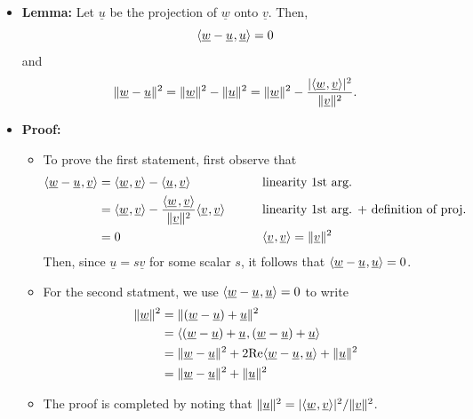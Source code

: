 \documentclass[11pt,twoside]{report}
\newcommand{\vecnot}{\underline}
\newcommand{\Real}{\mathrm{Re}}
\newcommand{\inner}[2]{{\left\langle #1 \mskip2mu , #2 \right\rangle}}
\newcommand{\tinner}[2]{{\langle #1 \mskip1mu , #2 \rangle}}
\begin{document}
\begin{itemize}
\begin{center}
\end{center}

\item \textbf{Lemma:} 
Let $\vecnot{u}$ be the projection of $\vecnot{w}$ onto $\vecnot{v}$.
Then, 
\[
\tinner{ \vecnot{w}-\vecnot{u} }{ \vecnot{u} } = 0
\]
and
\[ \|\vecnot{w}-\vecnot{u}\|^2 =  \|\vecnot{w}\|^2 - \| \vecnot{u} \|^2 = \|\vecnot{w}\|^2 - \frac{|\tinner{ \vecnot{w} }{ \vecnot{v} }|^2}{\|\vecnot{v}\|^2}. \]


\item \textbf{Proof:} 
\begin{itemize}
\item To prove the first statement, first observe that
\begin{alignat*}{3}
\tinner{ \vecnot{w} - \vecnot{u} }{ \vecnot{v} } & = \tinner{ \vecnot{w} }{ \vecnot{v} } - \tinner{ \vecnot{u} }{ \vecnot{v} }&\qquad & \text{linearity 1st arg.}\\
&  = \tinner{ \vecnot{w} }{ \vecnot{v} } - \frac{\inner{ \vecnot{w} }{ \vecnot{v} }}{\|\vecnot{v}\|^2} \tinner{ \vecnot{v} }{ \vecnot{v} }&& \text{linearity 1st arg. + definition of proj.}\\
&  = 0 && \tinner{ \vecnot{v} }{ \vecnot{v} } = \|\vecnot{v} \|^2
\end{alignat*}
Then, since $\vecnot{u} = s \vecnot{v}$ for some scalar $s$, it follows that $\tinner{ \vecnot{w}-\vecnot{u} }{ \vecnot{u} } =  0$.
\item For the second statment, we use  $\tinner{ \vecnot{w}-\vecnot{u} }{ \vecnot{u} } = 0$ to write
\begin{align*}
\|\vecnot{w}\|^2 &= \|(\vecnot{w}-\vecnot{u})+\vecnot{u}\|^2\\
&= \tinner{ (\vecnot{w}-\vecnot{u})+\vecnot{u}}{(\vecnot{w}-\vecnot{u})+\vecnot{u}} \\
&= \|\vecnot{w}-\vecnot{u}\|^2 + 2 \Real \tinner{ \vecnot{w}-\vecnot{u} }{ \vecnot{u} } + \|\vecnot{u}\|^2\\
& = \|\vecnot{w}-\vecnot{u}\|^2 + \|\vecnot{u}\|^2
\end{align*}
\item The proof is completed by noting that $\|\vecnot{u}\|^2 = |\tinner{ \vecnot{w} }{ \vecnot{v} }|^2 / \|\vecnot{v}\|^2$.
\end{itemize} 




\end{itemize}
\end{document}
